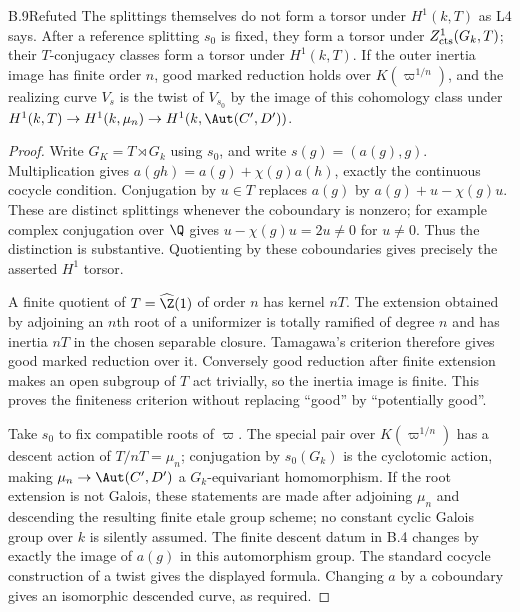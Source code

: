 \begin{claim}{B.9}{Refuted}
The splittings themselves do not form a torsor under $H^1(k,T)$ as L4 says.
After a reference splitting $s_0$ is fixed, they form a torsor under
$Z^1_{\rm cts}(G_k,T)$; their $T$-conjugacy classes form a torsor under
$H^1(k,T)$. If the outer inertia image has finite order $n$, good marked
reduction holds over $K(\varpi^{1/n})$, and the realizing curve $V_s$ is the
twist of $V_{s_0}$ by the image of this cohomology class under
$H^1(k,T)\to H^1(k,\mu_n)\to H^1(k,\Aut(C',D'))$.
\end{claim}
\begin{proof}
Write $G_K=T\rtimes G_k$ using $s_0$, and write
$s(g)=(a(g),g)$. Multiplication gives
$a(gh)=a(g)+\chi(g)a(h)$, exactly the continuous cocycle condition.
Conjugation by $u\in T$ replaces $a(g)$ by $a(g)+u-\chi(g)u$.
These are distinct splittings whenever the coboundary is nonzero; for
example complex conjugation over $\Q$ gives $u-\chi(g)u=2u\ne0$ for
$u\ne0$. Thus the distinction is substantive. Quotienting by these
coboundaries gives precisely the asserted $H^1$ torsor.

A finite quotient of $T=\widehat\Z(1)$ of order $n$ has kernel $nT$.
The extension obtained by adjoining an $n$th root of a uniformizer is totally
ramified of degree $n$ and has inertia $nT$ in the chosen separable closure.
Tamagawa's criterion therefore gives good marked reduction over it.
Conversely good reduction after finite extension makes an open subgroup of
$T$ act trivially, so the inertia image is finite. This proves the
finiteness criterion without replacing ``good'' by ``potentially good''.

Take $s_0$ to fix compatible roots of $\varpi$. The special pair over
$K(\varpi^{1/n})$ has a descent action of $T/nT=\mu_n$; conjugation by
$s_0(G_k)$ is the cyclotomic action, making
$\mu_n\to\Aut(C',D')$ a $G_k$-equivariant homomorphism. If the root extension
is not Galois, these statements are made after adjoining $\mu_n$ and
descending the resulting finite etale group scheme; no constant cyclic
Galois group over $k$ is silently assumed. The finite descent datum in B.4
changes by exactly the image of $a(g)$ in this automorphism group. The
standard cocycle construction of a twist gives the displayed formula.
Changing $a$ by a coboundary gives an isomorphic descended curve, as required.
\end{proof}

